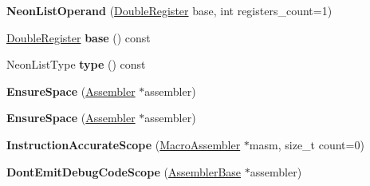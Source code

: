 \begin{DoxyCompactItemize}
\item 
{\bfseries Neon\+List\+Operand} (\hyperlink{structv8_1_1internal_1_1_double_register}{Double\+Register} base, int registers\+\_\+count=1)\hypertarget{classv8_1_1internal_1_1_b_a_s_e___e_m_b_e_d_d_e_d_a4943e49f3ac3a1b81a36ed6664080240}{}\label{classv8_1_1internal_1_1_b_a_s_e___e_m_b_e_d_d_e_d_a4943e49f3ac3a1b81a36ed6664080240}

\item 
\hyperlink{structv8_1_1internal_1_1_double_register}{Double\+Register} {\bfseries base} () const \hypertarget{classv8_1_1internal_1_1_b_a_s_e___e_m_b_e_d_d_e_d_a61a5265d308a7b1a46b9bc56ed2fa41e}{}\label{classv8_1_1internal_1_1_b_a_s_e___e_m_b_e_d_d_e_d_a61a5265d308a7b1a46b9bc56ed2fa41e}

\item 
Neon\+List\+Type {\bfseries type} () const \hypertarget{classv8_1_1internal_1_1_b_a_s_e___e_m_b_e_d_d_e_d_a684cea33e02bd445250e040a11a1f843}{}\label{classv8_1_1internal_1_1_b_a_s_e___e_m_b_e_d_d_e_d_a684cea33e02bd445250e040a11a1f843}

\item 
{\bfseries Ensure\+Space} (\hyperlink{classv8_1_1internal_1_1_assembler}{Assembler} $\ast$assembler)\hypertarget{classv8_1_1internal_1_1_b_a_s_e___e_m_b_e_d_d_e_d_a1783ae45958467ea414d65905637641f}{}\label{classv8_1_1internal_1_1_b_a_s_e___e_m_b_e_d_d_e_d_a1783ae45958467ea414d65905637641f}

\item 
{\bfseries Ensure\+Space} (\hyperlink{classv8_1_1internal_1_1_assembler}{Assembler} $\ast$assembler)\hypertarget{classv8_1_1internal_1_1_b_a_s_e___e_m_b_e_d_d_e_d_a1783ae45958467ea414d65905637641f}{}\label{classv8_1_1internal_1_1_b_a_s_e___e_m_b_e_d_d_e_d_a1783ae45958467ea414d65905637641f}

\item 
{\bfseries Instruction\+Accurate\+Scope} (\hyperlink{classv8_1_1internal_1_1_macro_assembler}{Macro\+Assembler} $\ast$masm, size\+\_\+t count=0)\hypertarget{classv8_1_1internal_1_1_b_a_s_e___e_m_b_e_d_d_e_d_a6b722cf06ce4f0325b7ce37ab354b233}{}\label{classv8_1_1internal_1_1_b_a_s_e___e_m_b_e_d_d_e_d_a6b722cf06ce4f0325b7ce37ab354b233}

\item 
{\bfseries Dont\+Emit\+Debug\+Code\+Scope} (\hyperlink{classv8_1_1internal_1_1_assembler_base}{Assembler\+Base} $\ast$assembler)\hypertarget{classv8_1_1internal_1_1_b_a_s_e___e_m_b_e_d_d_e_d_a4780517ca3f161e5ebd56b8ed22ba403}{}\label{classv8_1_1internal_1_1_b_a_s_e___e_m_b_e_d_d_e_d_a4780517ca3f161e5ebd56b8ed22ba403}


\end{DoxyCompactItemize}
